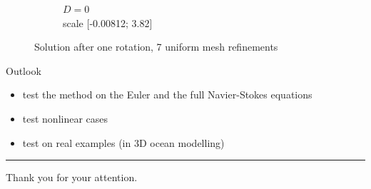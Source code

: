 \documentclass[mathserif]{beamer}
\begin{document}
\begin{frame}
\begin{figure}[H]
\begin{subfigure}[H]{0.3\textwidth}
		\vspace{-3mm}
		\caption{$D = 0$\\\vspace{-2mm}scale [-0.00812; 3.82]}
	\end{subfigure}
	\vspace{-3mm}
	\caption{Solution after one rotation, 7 uniform mesh refinements}	
\end{figure}

\end{frame}

\begin{frame}
\vspace{5mm}
\centering
{\Huge Outlook}\ \\
\begin{itemize}
\item test the method on the Euler and the full Navier-Stokes equations
\item test nonlinear cases
\item test on real examples (in 3D ocean modelling)
\end{itemize}
\vspace{6mm}
\noindent\rule{8cm}{0.4pt}

\vspace{8mm}
{\Huge Thank you for your attention.}

\end{frame}
\end{document}
